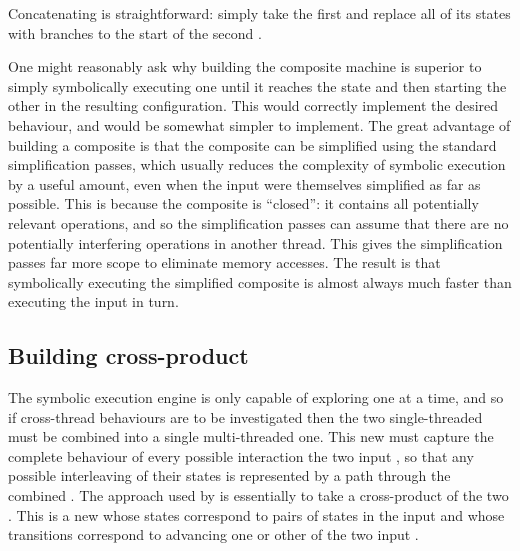 
Concatenating {\StateMachines} is straightforward: simply take the
first {\StateMachine} and replace all of its {\stSurvive} states
with branches to the start of the second {\StateMachine}.

 One might reasonably ask why building the
composite machine is superior to simply symbolically executing one
{\StateMachine} until it reaches the {\stSurvive} state and then
starting the other {\StateMachine} in the resulting configuration.
This would correctly implement the desired behaviour, and would be
somewhat simpler to implement.  The great advantage of building a
composite {\StateMachine} is that the composite {\StateMachine} can be
simplified using the standard {\StateMachine} simplification passes,
which usually reduces the complexity of symbolic execution by a useful
amount, even when the input {\StateMachines} were themselves
simplified as far as possible.  This is because the composite
{\StateMachine} is ``closed'': it contains all potentially relevant
operations, and so the simplification passes can assume that there are
no potentially interfering operations in another thread.  This gives
the simplification passes far more scope to eliminate memory accesses.
The result is that symbolically executing the simplified composite
{\StateMachine} is almost always much faster than executing the input
{\StateMachines} in turn.  


\subsection{Building cross-product {\StateMachines}}
\label{sect:using:build_cross_product}

The symbolic execution engine is only capable of exploring one
{\StateMachine} at a time, and so if cross-thread behaviours are to be
investigated then the two single-threaded {\StateMachines} must be
combined into a single multi-threaded one.  This new {\StateMachine}
must capture the complete behaviour of every possible interaction the
two input {\StateMachines}, so that any possible interleaving of their
states is represented by a path through the combined {\StateMachine}.
The approach used by {\technique} is essentially to take a
cross-product of the two {\StateMachines}.  This is a new
{\StateMachine} whose states correspond to pairs of states in the
input {\StateMachine} and whose transitions correspond to advancing
one or other of the two input {\StateMachines}.

